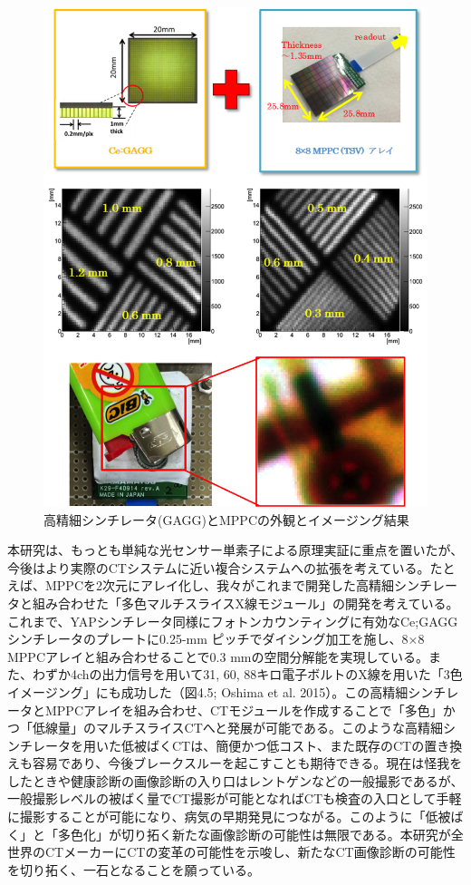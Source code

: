 \begin{figure}[H]
 \begin{center}
 \includegraphics[bb=0.000000 0.000000 400.766870 520.276990,width=1\hsize]{image2/chapter5/oshimaetal.png} 
 \end{center}
 \caption{高精細シンチレータ(GAGG)とMPPCの外観とイメージング結果}
 \label{fig:oshimaetal}
\end{figure}

本研究は、もっとも単純な光センサー単素子による原理実証に重点を置いたが、今後はより実際のCTシステムに近い複合システムへの拡張を考えている。たとえば、MPPCを2次元にアレイ化し、我々がこれまで開発した高精細シンチレータと組み合わせた「多色マルチスライスX線モジュール」の開発を考えている。これまで、YAPシンチレータ同様にフォトンカウンティングに有効なCe;GAGG シンチレータのプレートに0.25-mm ピッチでダイシング加工を施し、8×8 MPPCアレイと組み合わせることで0.3 mmの空間分解能を実現している。また、わずか4chの出力信号を用いて31, 60, 88キロ電子ボルトのX線を用いた「3色イメージング」にも成功した（図4.5; Oshima et al. 2015）。この高精細シンチレータとMPPCアレイを組み合わせ、CTモジュールを作成することで「多色」かつ「低線量」のマルチスライスCTへと発展が可能である。このような高精細シンチレータを用いた低被ばくCTは、簡便かつ低コスト、また既存のCTの置き換えも容易であり、今後ブレークスルーを起こすことも期待できる。現在は怪我をしたときや健康診断の画像診断の入り口はレントゲンなどの一般撮影であるが、一般撮影レベルの被ばく量でCT撮影が可能となればCTも検査の入口として手軽に撮影することが可能になり、病気の早期発見につながる。このように「低被ばく」と「多色化」が切り拓く新たな画像診断の可能性は無限である。本研究が全世界のCTメーカーにCTの変革の可能性を示唆し、新たなCT画像診断の可能性を切り拓く、一石となることを願っている。